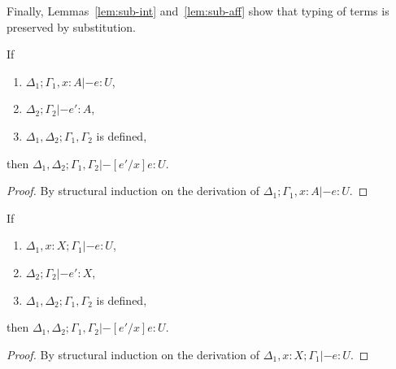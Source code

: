 Finally, Lemmas~\ref{lem:sub-int} and~\ref{lem:sub-aff} show that typing of
terms is preserved by substitution.

\begin{lemma}\label{lem:sub-int}
  If
  \begin{enumerate}
  \item $\Delta_1; \Gamma_1, x : A |- e : U$,
  \item $\Delta_2; \Gamma_2 |- e' : A$,
  \item $\Delta_1,\Delta_2 ; \Gamma_1,\Gamma_2$ is defined,
  \end{enumerate}
  then $\Delta_1,\Delta_2; \Gamma_1,\Gamma_2 |- [e'/x]e : U$.
  \begin{proof}
    By structural induction on the derivation of $\Delta_1; \Gamma_1, x : A |- e : U$.
  \end{proof}
\end{lemma}

\begin{lemma}\label{lem:sub-aff}
  If
  \begin{enumerate}
  \item $\Delta_1, x : X; \Gamma_1 |- e : U$,
  \item $\Delta_2; \Gamma_2 |- e' : X$,
  \item $\Delta_1,\Delta_2 ; \Gamma_1,\Gamma_2$ is defined,
  \end{enumerate}
  then $\Delta_1,\Delta_2; \Gamma_1,\Gamma_2 |- [e'/x]e : U$.
  \begin{proof}
    By structural induction on the derivation of $\Delta_1, x : X; \Gamma_1 |- e : U$.
  \end{proof}
\end{lemma}

